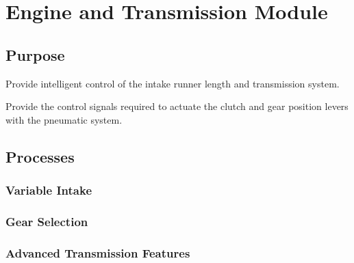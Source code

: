 \section{Engine and Transmission Module}


\subsection{Purpose}

Provide intelligent control of the intake runner length and transmission system.

Provide the control signals required to actuate the clutch and gear position levers with the pneumatic system.


\subsection{Processes}


\subsubsection{Variable Intake}


\subsubsection{Gear Selection \label{sec:design_engine_transmission_gear_selection}}


\subsubsection{Advanced Transmission Features}

